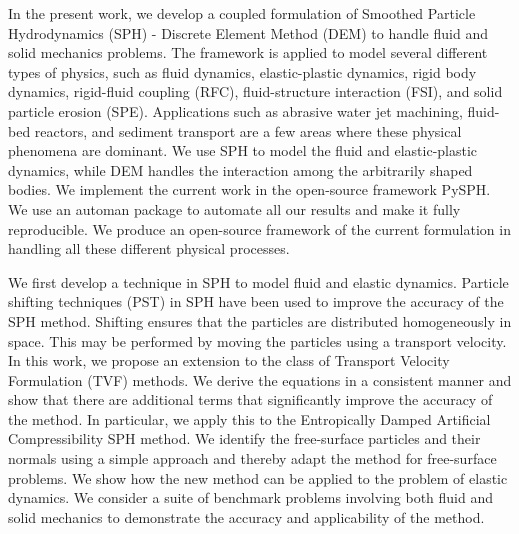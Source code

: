 \begin{Abstract}
  In the present work, we develop a coupled formulation of Smoothed Particle
  Hydrodynamics (SPH) - Discrete Element Method (DEM) to handle fluid and solid
  mechanics problems. The framework is applied to model several different types
  of physics, such as fluid dynamics, elastic-plastic dynamics, rigid body
  dynamics, rigid-fluid coupling (RFC), fluid-structure interaction (FSI), and
  solid particle erosion (SPE). Applications such as abrasive water jet
  machining, fluid-bed reactors, and sediment transport are a few areas where
  these physical phenomena are dominant. We use SPH to model the fluid and
  elastic-plastic dynamics, while DEM handles the interaction among the
  arbitrarily shaped bodies. We implement the current work in the open-source
  framework PySPH. We use an automan package to automate all our results and
  make it fully reproducible. We produce an open-source framework of
  the current formulation in handling all these different physical processes.


  We first develop a technique in SPH to model fluid and elastic dynamics.
  Particle shifting techniques (PST) in SPH have been used to improve the
  accuracy of the SPH method. Shifting ensures that the particles are
  distributed homogeneously in space. This may be performed by moving the
  particles using a transport velocity. In this work, we propose an extension
  to the class of Transport Velocity Formulation (TVF) methods. We derive the
  equations in a consistent manner and show that there are additional terms that
  significantly improve the accuracy of the method. In particular, we apply this
  to the Entropically Damped Artificial Compressibility SPH method. We identify
  the free-surface particles and their normals using a simple approach and
  thereby adapt the method for free-surface problems. We show how the new method
  can be applied to the problem of elastic dynamics. We consider a suite of
  benchmark problems involving both fluid and solid mechanics to demonstrate the
  accuracy and applicability of the method.


\end{Abstract}
